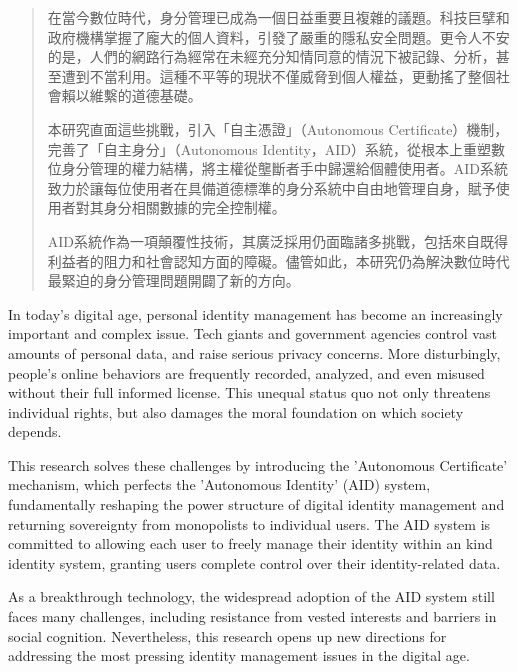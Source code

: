 
\begin{abstract}
  在當今數位時代，身分管理已成為一個日益重要且複雜的議題。科技巨擘和政府機構掌握了龐大的個人資料，引發了嚴重的隱私安全問題。更令人不安的是，人們的網路行為經常在未經充分知情同意的情況下被記錄、分析，甚至遭到不當利用。這種不平等的現狀不僅威脅到個人權益，更動搖了整個社會賴以維繫的道德基礎。

  本研究直面這些挑戰，引入「自主憑證」（Autonomous Certificate）機制，完善了「自主身分」（Autonomous Identity，AID）系統，從根本上重塑數位身分管理的權力結構，將主權從壟斷者手中歸還給個體使用者。AID系統致力於讓每位使用者在具備道德標準的身分系統中自由地管理自身，賦予使用者對其身分相關數據的完全控制權。

  AID系統作為一項顛覆性技術，其廣泛採用仍面臨諸多挑戰，包括來自既得利益者的阻力和社會認知方面的障礙。儘管如此，本研究仍為解決數位時代最緊迫的身分管理問題開闢了新的方向。
\end{abstract}

\begin{abstract*}
  In today's digital age, personal identity management has become an increasingly important and complex issue. Tech giants and government agencies control vast amounts of personal data, and raise serious privacy concerns. More disturbingly, people's online behaviors are frequently recorded, analyzed, and even misused without their full informed license. This unequal status quo not only threatens individual rights, but also damages the moral foundation on which society depends.

  This research solves these challenges by introducing the 'Autonomous Certificate' mechanism, which perfects the 'Autonomous Identity' (AID) system, fundamentally reshaping the power structure of digital identity management and returning sovereignty from monopolists to individual users. The AID system is committed to allowing each user to freely manage their identity within an kind identity system, granting users complete control over their identity-related data.

  As a breakthrough technology, the widespread adoption of the AID system still faces many challenges, including resistance from vested interests and barriers in social cognition. Nevertheless, this research opens up new directions for addressing the most pressing identity management issues in the digital age.
\end{abstract*}